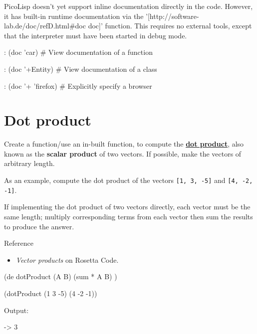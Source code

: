 \begin{wideverbatim}

PicoLisp doesn't yet support inline documentation directly in the code. However,
it has built-in runtime documentation via the
'[http://software-lab.de/doc/refD.html#doc doc]' function. This requires no
external tools, except that the interpreter must have been started in debug
mode.

: (doc 'car)         # View documentation of a function

: (doc '+Entity)     # View documentation of a class

: (doc '+ 'firefox)  # Explicitly specify a browser

\end{wideverbatim}

\pagebreak{}
\section*{Dot product}

Create a function/use an in-built function, to compute the
\textbf{\href{http://en.wikipedia.org/wiki/Dot\_product}{dot product}},
also known as the \textbf{scalar product} of two vectors. If possible,
make the vectors of arbitrary length.

As an example, compute the dot product of the vectors
\texttt{{[}1, 3, -5{]}} and \texttt{{[}4, -2, -1{]}}.

If implementing the dot product of two vectors directly, each vector
must be the same length; multiply corresponding terms from each vector
then sum the results to produce the answer.

\begin{description}
\item[Reference]
\end{description}

\begin{itemize}
\item \emph{Vector products} on Rosetta Code.
\end{itemize}


\begin{wideverbatim}

(de dotProduct (A B)
   (sum * A B) )

(dotProduct (1 3 -5) (4 -2 -1))

Output:

-> 3

\end{wideverbatim}

